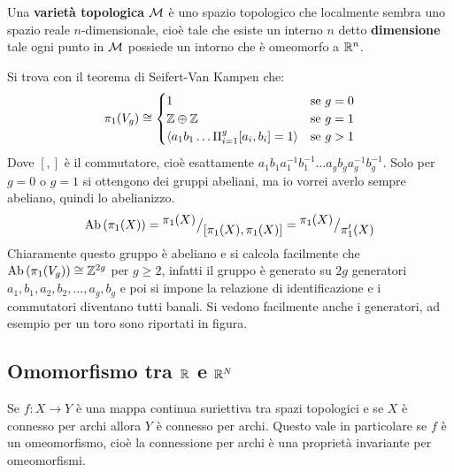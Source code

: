 \begin{example}
  \begin{definition}
    Una \textbf{varietà topologica} $ \mathcal{M} $ è uno spazio topologico
    che localmente sembra uno spazio reale $ n $-dimensionale, cioè tale che esiste un
    interno $ n $ detto \textbf{dimensione}
    tale ogni punto in $ \mathcal{M} $ possiede un intorno che è omeomorfo a $ \mathbb{R}^{n} $.
  \end{definition}
  Si trova con il teorema di Seifert-Van Kampen che:
  \[
    \pi_1(V_g) \cong
    \begin{cases}
      1 & \text{se } g = 0 \\
      \mathbb{Z} \oplus \mathbb{Z} & \text{se } g = 1 \\
      \langle a_1 b_1 \dots \Pi_{i=1}^g [a_i,b_i] = 1 \rangle & \text{se } g > 1
    \end{cases}
  \]
  Dove $ [,] $ è il commutatore, cioè esattamente $ a_1 b_1 a_1^{-1} b_1^{-1} \dots a_g b_g a_g^{-1} b_g^{-1} $.
  Solo per $ g = 0 $ o $ g = 1 $ si ottengono dei gruppi abeliani, ma io vorrei averlo sempre abeliano, quindi lo abelianizzo.
  \[
    \mathrm{Ab}\left( \pi_1(X) \right) = {^{\textstyle \pi_1(X)}\big/_{\textstyle [\pi_1(X), \pi_1(X)]}} = {^{\textstyle \pi_1(X)}\big/_{\textstyle \pi_1'(X)}}
  \]
  Chiaramente questo gruppo è abeliano e si calcola facilmente che $ \mathrm{Ab}\left( \pi_1(V_g) \right) \cong \mathbb{Z}^{2g} $ per $ g \geq 2 $,
  infatti il gruppo è generato su $ 2 g $ generatori $ a_1, b_1, a_2, b_2, \dots, a_g, b_g $ e poi
  si impone la relazione di identificazione e i commutatori diventano tutti banali.
  Si vedono facilmente anche i generatori, ad esempio per un toro sono riportati in figura.
\end{example}


\subsection{Omomorfismo tra $ \mathbb{R}^{} $ e $ \mathbb{R}^{N} $}


\begin{proposition}
  Se $ f:X \to Y $ è una mappa continua suriettiva tra spazi topologici e se
  $ X $ è connesso per archi allora $ Y $ è connesso per archi. Questo vale in
  particolare se $ f $ è un omeomorfismo, cioè la connessione per archi è una
  proprietà invariante per omeomorfismi.
\end{proposition}

